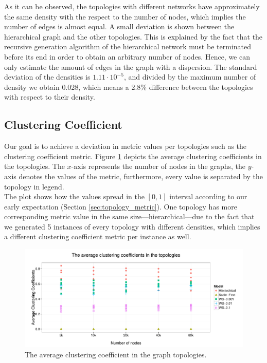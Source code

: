 As it can be observed, the topologies with different networks have approximately the same density with the respect to the number of nodes, which implies the number of edges is almost equal. A small deviation is shown between the hierarchical graph and the other topologies. This is explained by the fact that the recursive generation algorithm of the hierarchical network must be terminated before its end in order to obtain an arbitrary number of nodes. Hence, we can only estimate the amount of edges in the graph with a dispersion. The standard deviation of the densities is $1.11 \cdot 10^{-5}$, and divided by the maximum number of density we obtain 0.028, which means a 2.8\% difference between the topologies with respect to their density.

\subsection{Clustering Coefficient}

Our goal is to achieve a deviation in metric values per topologies such as the clustering coefficient metric. Figure \ref{fig:clustering_metric} depicts the average clustering coefficients in the topologies. The $x$-axis represents the number of nodes in the graphs, the $y$-axis denotes the values of the metric, furthermore, every value is separated by the topology in legend.\\
The plot shows how the values spread in the $[0,1]$ interval according to our early expectation (Section \ref{sec:topology_metric}). One topology has more corresponding metric value in the same size---\eg hierarchical---due to the fact that we generated 5 instances of every topology with different densities, which implies a different clustering coefficient metric per instance as well.

\begin{figure}[!ht]
	\centering
	\includegraphics[width=160mm, keepaspectratio]{figures/clustering_metric.pdf}
	\caption{The average clustering coefficient in the graph topologies.}
	\label{fig:clustering_metric}
\end{figure}

